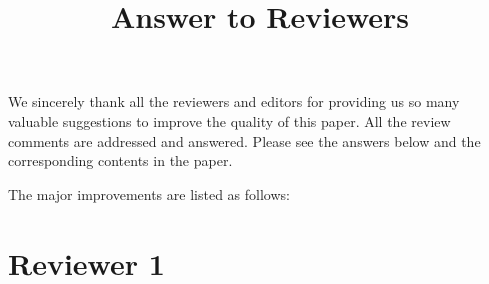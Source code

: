 \documentclass[12pt]{paper}
\title{Answer to Reviewers}
\newcommand{\rev}{\color[rgb]{0,0,1}}
\newcommand{\reviewer}[1]{\section*{Reviewer #1}}
\begin{document}
\maketitle

We sincerely thank all the reviewers and editors for providing us so many valuable suggestions to improve the quality of this paper. All the review comments are addressed and answered. Please see the answers below and the corresponding contents in the paper.

{\rev{The newly added contents and the major revised contents are marked in blue in the paper.}}

The major improvements are listed as follows:

\reviewer{1}
\end{document}
